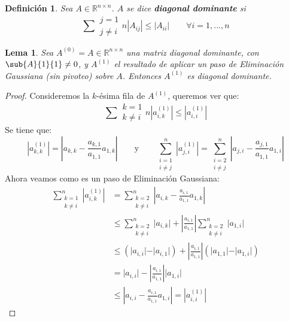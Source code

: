 \documentclass[12pt]{article}
\newtheorem{lema}{Lema}
\newtheorem{defi}{Definición}
\begin{document}
\begin{defi}
Sea \(A \in \mathbb{R}^{n \times n}\). \(A\) se dice \textbf{diagonal dominante} si 
\[
  \sum{\substack{j = 1 \\ j \neq i}}{n}|A_{ij}| \leq  |A_{ii}| \qquad \forall i = 1, ..., n
\]
\end{defi}

\begin{lema}
\label{lema:EG conserva diagonal dominante}
Sea \(A^{(0)} = A \in \mathbb{R}^{n \times n}\) una matriz diagonal dominante, con \(\sub{A}{1}{1} \neq 0\), y \(A^{(1)}\) el resultado de aplicar un paso de Eliminación Gaussiana (sin pivoteo) sobre \(A\). Entonces \(A^{(1)}\) es diagonal dominante.
\end{lema}
\begin{proof}
Consideremos la \(k\)-ésima fila de \(A^{(1)}\), queremos ver que:
\[
  \sum{\substack{k = 1 \\ k \neq i}}{n} |a^{(1)}_{i,k}| \leq |a^{(1)}_{i,i} |
\]
Se tiene que:
\[
  | a^{(1)}_{k,k} | = | a_{k,k} - \frac{a_{k,1}}{a_{1,1}} a_{1,k} |
  \qquad \text{y} \qquad
  \sum_{\substack{i = 1 \\ i \neq j}}^n | a^{(1)}_{j,i} |
= \sum_{\substack{i = 2 \\ i \neq j}}^n | a_{j,i} - \frac{a_{j,1}}{a_{1,1}} a_{1,i} |
\]
Ahora veamos como es un paso de Eliminación Gaussiana:
\[\begin{split}
  \sum_{\substack{k = 1 \\ k \neq i}}^n | a^{(1)}_{i,k} | & = \sum_{\substack{k = 2 \\ k \neq i}}^n | a_{i,k} - \frac{a_{i,1}}{a_{1,1}} a_{1,k} | \\
                                                          & \leq \sum_{\substack{k = 2 \\ k \neq i}}^n \vert a_{i,k} \vert + \left \vert \frac{a_{i,1}}{a_{1,1}} \right \vert \sum_{\substack{k = 2 \\ k \neq i}}^n \vert a_{1,i} \vert \\
                                                          & \leq \left( \vert a_{i,i} \vert - \vert a_{i,1} \vert \right) + \left \vert \frac{a_{i,1}}{a_{1,1}} \right \vert \left( \vert a_{1,1} \vert - \vert a_{1,i} \vert \right) \\
                                                          & = \vert a_{i,i} \vert - \left \vert \frac{a_{i,1}}{a_{1,1}} \right \vert \vert a_{1,i} \vert \\
                                                          & \leq \left \vert a_{i,i} -  \frac{a_{i,1}}{a_{1,1}} a_{1,i} \right \vert = | a^{(1)}_{i,i} | 
\end{split}\]
\end{proof}
\end{document}
